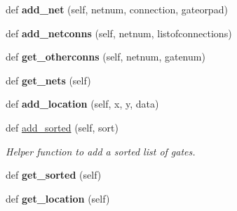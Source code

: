 \begin{DoxyCompactItemize}
\item 
def {\bfseries add\+\_\+net} (self, netnum, connection, gateorpad)\hypertarget{classgqp__placer_1_1mothercore_a0bcf31558757a0edd15a586468715378}{}\label{classgqp__placer_1_1mothercore_a0bcf31558757a0edd15a586468715378}

\item 
def {\bfseries add\+\_\+netconns} (self, netnum, listofconnections)\hypertarget{classgqp__placer_1_1mothercore_aff93e1055cd53093faf6ec7e743f8433}{}\label{classgqp__placer_1_1mothercore_aff93e1055cd53093faf6ec7e743f8433}

\item 
def {\bfseries get\+\_\+otherconns} (self, netnum, gatenum)\hypertarget{classgqp__placer_1_1mothercore_a8ca67285ee77dac596b73128c9b655af}{}\label{classgqp__placer_1_1mothercore_a8ca67285ee77dac596b73128c9b655af}

\item 
def {\bfseries get\+\_\+nets} (self)\hypertarget{classgqp__placer_1_1mothercore_aeea04940559af5cbcf30f508d6d89d19}{}\label{classgqp__placer_1_1mothercore_aeea04940559af5cbcf30f508d6d89d19}

\item 
def {\bfseries add\+\_\+location} (self, x, y, data)\hypertarget{classgqp__placer_1_1mothercore_a241bd6a3a70001d27965250630df7558}{}\label{classgqp__placer_1_1mothercore_a241bd6a3a70001d27965250630df7558}

\item 
def \hyperlink{classgqp__placer_1_1mothercore_a66c7983b80befa6e904a94e3e0621335}{add\+\_\+sorted} (self, sort)\hypertarget{classgqp__placer_1_1mothercore_a66c7983b80befa6e904a94e3e0621335}{}\label{classgqp__placer_1_1mothercore_a66c7983b80befa6e904a94e3e0621335}

\begin{DoxyCompactList}\small\item\em Helper function to add a sorted list of gates. \end{DoxyCompactList}\item 
def {\bfseries get\+\_\+sorted} (self)\hypertarget{classgqp__placer_1_1mothercore_a0b7370acc65d6940cc5e200bb53cae1e}{}\label{classgqp__placer_1_1mothercore_a0b7370acc65d6940cc5e200bb53cae1e}

\item 
def {\bfseries get\+\_\+location} (self)\hypertarget{classgqp__placer_1_1mothercore_ae1782ee57912d541a5ea81111eb68db6}{}\label{classgqp__placer_1_1mothercore_ae1782ee57912d541a5ea81111eb68db6}

\end{DoxyCompactItemize}
